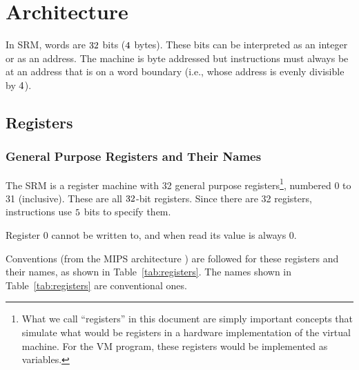 \documentclass[11pt,letterpaper]{article}
\newcommand{\tabref}[1]{Table~\ref{#1}}  %
\newcommand{\tabnref}[1]{Table~\ref{#1}}  %
\begin{document}
\section{Architecture}

In SRM, words are $32$ bits ($4$ bytes).
These bits can be interpreted as an integer or as an address.
The machine is byte addressed but instructions must always be at an
address that is on a word boundary (i.e., whose address is evenly
divisible by $4$).

\subsection{Registers}

\subsubsection{General Purpose Registers and Their Names}

The SRM is a register machine with 32
general purpose registers\footnote{What we call
``registers'' in this document are simply important concepts that
simulate what would be registers in a hardware implementation of the
virtual machine. For the VM program, these registers would be implemented
as variables.},
numbered 0 to 31 (inclusive).
These are all $32$-bit registers.
Since there are 32 registers,
instructions use $5$ bits to specify them.

Register 0 cannot be written to, and when read its value is always 0.

Conventions (from the MIPS architecture \cite{Kane-Heinrich92}) are
followed for these registers and their names,
as shown in \tabref{tab:registers}.
The names shown in \tabnref{tab:registers} are conventional ones.
\end{document}
